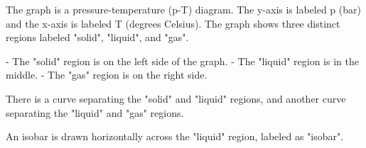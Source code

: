 The graph is a pressure-temperature (p-T) diagram. The y-axis is labeled p (bar) and the x-axis is labeled T (degrees Celsius). The graph shows three distinct regions labeled "solid", "liquid", and "gas".

- The "solid" region is on the left side of the graph.
- The "liquid" region is in the middle.
- The "gas" region is on the right side.

There is a curve separating the "solid" and "liquid" regions, and another curve separating the "liquid" and "gas" regions.

An isobar is drawn horizontally across the "liquid" region, labeled as "isobar".